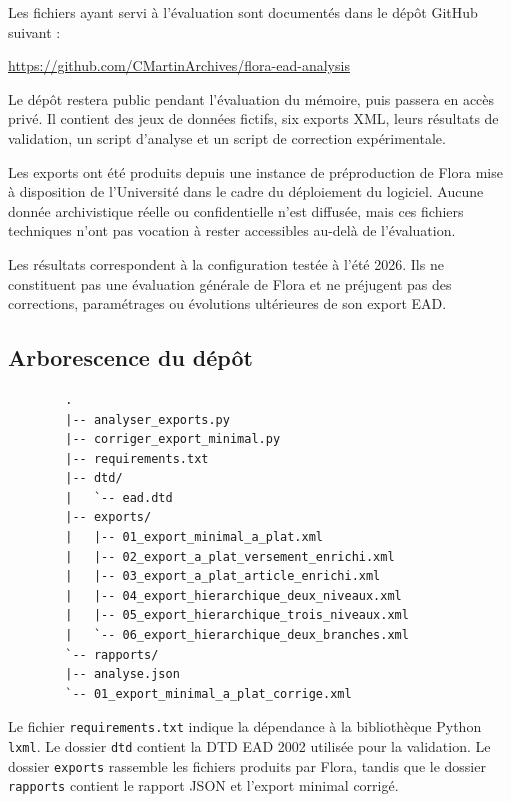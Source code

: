 Les fichiers ayant servi à l'évaluation sont documentés dans le dépôt GitHub suivant :

\begin{center}
	\url{https://github.com/CMartinArchives/flora-ead-analysis}
\end{center}

Le dépôt restera public pendant l'évaluation du mémoire, puis passera en accès privé. Il contient des jeux de données fictifs, six exports XML, leurs résultats de validation, un script d'analyse et un script de correction expérimentale.

Les exports ont été produits depuis une instance de préproduction de Flora mise à disposition de l'Université dans le cadre du déploiement du logiciel. Aucune donnée archivistique réelle ou confidentielle n'est diffusée, mais ces fichiers techniques n'ont pas vocation à rester accessibles au-delà de l'évaluation.

Les résultats correspondent à la configuration testée à l'été 2026. Ils ne constituent pas une évaluation générale de Flora et ne préjugent pas des corrections, paramétrages ou évolutions ultérieures de son export EAD.

\subsection{Arborescence du dépôt}

\begin{minipage}{\textwidth}
	\footnotesize
	\begin{verbatim}
		.
		|-- analyser_exports.py
		|-- corriger_export_minimal.py
		|-- requirements.txt
		|-- dtd/
		|   `-- ead.dtd
		|-- exports/
		|   |-- 01_export_minimal_a_plat.xml
		|   |-- 02_export_a_plat_versement_enrichi.xml
		|   |-- 03_export_a_plat_article_enrichi.xml
		|   |-- 04_export_hierarchique_deux_niveaux.xml
		|   |-- 05_export_hierarchique_trois_niveaux.xml
		|   `-- 06_export_hierarchique_deux_branches.xml
		`-- rapports/
		|-- analyse.json
		`-- 01_export_minimal_a_plat_corrige.xml
	\end{verbatim}
\end{minipage}

Le fichier \texttt{requirements.txt} indique la dépendance à la bibliothèque Python \texttt{lxml}. Le dossier \texttt{dtd} contient la DTD EAD 2002 utilisée pour la validation. Le dossier \texttt{exports} rassemble les fichiers produits par Flora, tandis que le dossier \texttt{rapports} contient le rapport JSON et l'export minimal corrigé.

